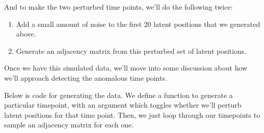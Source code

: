 \documentclass[letterpaper,10pt,english]{jupyterBook}
\begin{document}
\sphinxAtStartPar
And to make the two perturbed time points, we’ll do the following twice:
\begin{enumerate}
%
\item {} 
\sphinxAtStartPar
Add a small amount of noise to the first 20 latent positions that we generated above.

\item {} 
\sphinxAtStartPar
Generate an adjacency matrix from this perturbed set of latent positions.

\end{enumerate}

\sphinxAtStartPar
Once we have this simulated data, we’ll move into some discussion about how we’ll approach detecting the anomalous time points.

\sphinxAtStartPar
Below is code for generating the data. We define a function to generate a particular time\sphinxhyphen{}point, with an argument which toggles whether we’ll perturb latent positions for that time point. Then, we just loop through our time\sphinxhyphen{}points to sample an adjacency matrix for each one.
\end{document}
